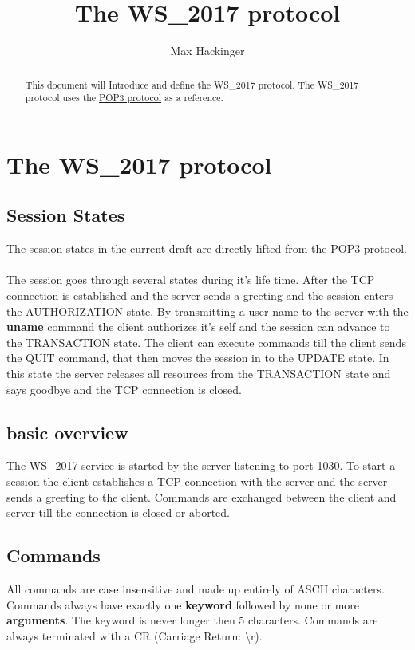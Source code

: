\documentclass[a4paper,11pt]{article}
\title{The WS\_2017 protocol}
\author{Max Hackinger}
\begin{document}
\maketitle
\tableofcontents
\clearpage

\begin{abstract}
This document will Introduce and define the WS\_2017 protocol.
The WS\_2017 protocol uses the \href{https://tools.ietf.org/html/rfc1939}{POP3 protocol} as a reference.
\end{abstract}

\section{The WS\_2017 protocol}

\subsection{Session States}
The session states in the current draft are directly lifted from the POP3 protocol.\\\\
The session goes through several states during it's life time. After the TCP connection is established and the server sends a greeting and the session enters the AUTHORIZATION state. By transmitting a user name to the server with the \textbf{uname} command the client authorizes it's self and the session can advance to the TRANSACTION state. The client can execute commands till the client sends the QUIT command, that then moves the session in to the UPDATE state. In this state the server releases all resources from the TRANSACTION state and says goodbye and the TCP connection is closed.

\subsection{basic overview}
The WS\_2017 service is started by the server listening to port 1030. To start a session the client establishes a TCP connection with the server and the server sends a greeting to the client. Commands are exchanged between the client and server till the connection is closed or aborted.

\subsection{Commands}
All commands are case insensitive and made up entirely of ASCII characters. Commands always have exactly one \textbf{keyword} followed by none or more \textbf{arguments}. The keyword is never longer then 5 characters. Commands are always terminated with a CR (Carriage Return: \textbackslash r).
\clearpage
\end{document}
